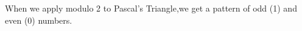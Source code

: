 \documentclass[preview]{standalone}
\begin{document}
\begin{center}
When we apply modulo 2 to Pascal's Triangle,we get a pattern of odd (1) and even (0) numbers.
\end{center}
\end{document}

